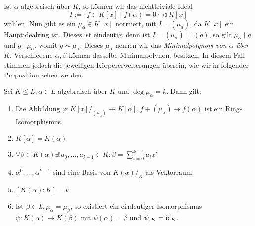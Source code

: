 \begin{remark}
    Ist $\alpha$ algebraisch über $K$, so können wir das nichttriviale Ideal
    $$ I := \{ f \in K[x] \mid f(\alpha) = 0 \} \vartriangleleft K[x] $$
    wählen. Nun gibt es ein $\mu_\alpha \in K[x]$ normiert, mit $I = (\mu_a)$, da $K[x]$ ein Hauptidealring ist. Dieses ist eindeutig, denn ist $I = (\mu_\alpha) = (g)$, so gilt $\mu_\alpha \mid g$ und $g \mid \mu_\alpha$, womit $g \sim \mu_\alpha$. Dieses $\mu_\alpha$ nennen wir das \emph{Minimalpolynom von $\alpha$ über $K$}. Verschiedene $\alpha, \beta$ können dasselbe Minimalpolynom besitzen. In diesem Fall stimmen jedoch die jeweiligen Körpererweiterungen überein, wie wir in folgender Proposition sehen werden.
\end{remark}

\begin{proposition}
    Sei $K \leq L, \alpha \in L$ algebraisch über $K$ und $\deg \mu_\alpha = k$. Dann gilt:
    \begin{enumerate}
        \item Die Abbildung $\varphi : K[x]/_{(\mu_\alpha)} \to K[\alpha], f + (\mu_\alpha) \mapsto f(\alpha)$ ist ein Ring-Isomorphismus.
        \item $K[\alpha] = K(\alpha)$
        \item $\forall \beta \in K(\alpha) \exists ! a_0, \hdots, a_{k-1} \in K: \beta = \sum_{i=0}^{k-1}a_i x^i$
        \item $\alpha^0, \hdots, \alpha^{k-1}$ sind eine Basis von $K(\alpha)/_K$ als Vektorraum.
        \item $[K(\alpha) : K] = k$
        \item Ist $\beta \in L, \mu_\alpha = \mu_\beta$, so existiert ein eindeutiger Isomorphismus $\psi : K(\alpha) \to K(\beta)$ mit $\psi(\alpha) = \beta$ und $\psi\vert_K = \operatorname{id}_K$.
    \end{enumerate}
\end{proposition}

